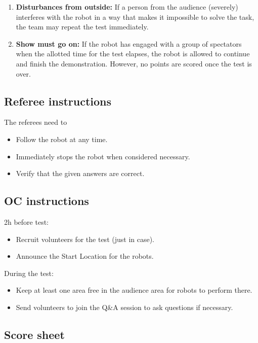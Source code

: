 \begin{enumerate}
	\item \textbf{Disturbances from outside:} If a person from the audience (severely) interferes with the robot in a way that makes it impossible to solve the task, the team may repeat the test immediately.\\

	\item \textbf{Show must go on:} If the robot has engaged with a group of spectators when the allotted time for the test elapses, the robot is allowed to continue and finish the demonstration. However, no points are scored once the test is over.
\end{enumerate}

\subsection{Referee instructions}

The referees need to
\begin{itemize}
	\item Follow the robot at any time.
	\item Immediately stops the robot when considered necessary.
	\item Verify that the given answers are correct.
\end{itemize}

\subsection{OC instructions}

2h before test:
\begin{itemize}
	\item Recruit volunteers for the test (just in case).
	\item Announce the Start Location for the robots.
\end{itemize}

During the test:
\begin{itemize}
	\item Keep at least one area free in the audience area for robots to perform there.
	\item Send volunteers to join the Q\&A session to ask questions if necessary.
\end{itemize}

\newpage 
\subsection{Score sheet}
